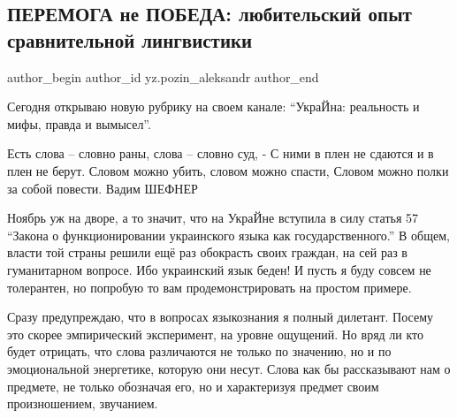  
 
 
 
 
\subsection{ПЕРЕМОГА не ПОБЕДА: любительский опыт сравнительной лингвистики}
\label{sec:11_11_2020.yz.pozin_aleksandr.1.peremoga_ne_pobeda}


\ifcmt
 author_begin
   author_id yz.pozin_aleksandr
 author_end
\fi

Сегодня открываю новую рубрику на своем канале: \enquote{УкраЙна: реальность и мифы,
правда и вымысел}. 

\begin{zznagolos}
\obeylines
Есть слова – словно раны, слова – словно суд, - 
С ними в плен не сдаются и в плен не берут. 
Словом можно убить, словом можно спасти, 
Словом можно полки за собой повести.
Вадим ШЕФНЕР
\end{zznagolos}


Ноябрь уж на дворе, а то значит, что на УкраЙне вступила в силу статья 57
\enquote{Закона о функционировании украинского языка как государственного.} В общем,
власти той страны решили ещё раз обокрасть своих граждан, на сей раз в
гуманитарном вопросе. Ибо украинский язык беден! И пусть я буду совсем не
толерантен, но попробую то вам продемонстрировать на простом примере.

Сразу предупреждаю, что в вопросах языкознания я полный дилетант. Посему  это
скорее эмпирический эксперимент, на уровне ощущений. Но вряд ли кто будет
отрицать, что слова различаются не только по значению, но и по эмоциональной
энергетике, которую они несут. Слова как бы рассказывают нам о предмете, не
только обозначая его, но и характеризуя предмет своим произношением, звучанием.

